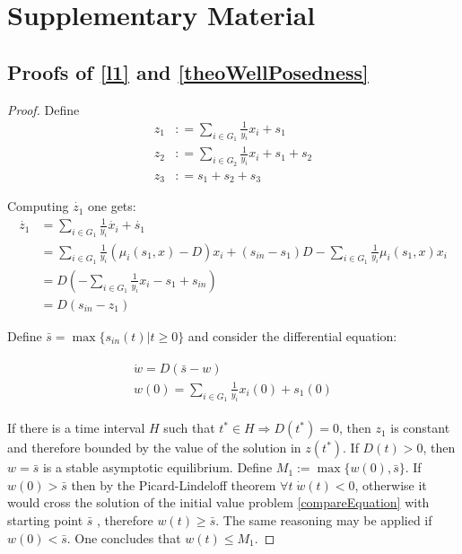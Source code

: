 \documentclass[3p,times]{article}
\begin{document}
\section{Supplementary Material}

\subsection{Proofs of \cref{l1} and \cref{theoWellPosedness}}

\systembounds* 

\begin{proof}
	Define 
	\begin{align}
	z_1 &: = \sum \limits_{i \in G_1} \frac{1}{y_i}x_i + s_1  \\
	z_2 &: = \sum \limits_{i \in G_2} \frac{1}{y_i}x_i + s_1 + s_2 \\
	z_3 &: = s_1 + s_2 + s_3
	\end{align} 
	
	Computing $\dot{z_{1}}$ one gets:
	\begin{align*}
	\dot{z_{1}} &=\sum \limits_{i \in G_1} \frac{1}{y_i}\dot{x_i} + \dot{s_1} \\
	& = \sum \limits_{i \in G_1} \frac{1}{y_i}\left(\mu_i(s_1,x) -D \right)x_i + (s_{in}-s_1)D-\sum\limits_{i \in G_1}\frac{1}{y_i}\mu_i(s_1,x) x_i   \\
	&= 	D\left(-\sum \limits_{i \in G_1} \frac{1}{y_i}x_i - s_1 + s_{in}\right)  \\
	& = D(s_{in} - z_1)
	\end{align*}
	
	Define $\bar{s} =\max\{s_{in}(t) | t\geq 0\}$ and consider the differential equation:
	
	\begin{align}
	\label{compareEquation}
	\begin{array}{l}
	\dot{w} = D(\bar{s} - w) \\
	w(0) = \sum \limits_{i \in G_1} \frac{1}{y_i}x_i(0) + s_1(0)
	\end{array}
	\end{align}
	
	If there is a time interval $H$ such that $t^*\in H  \Rightarrow D(t^*) = 0$, then $z_1$ is constant and therefore bounded by  the value of the solution in $z(t^*)$. 
	If $D(t) > 0$, then $w = \bar{s}$ is a stable asymptotic equilibrium. Define $M_1 :=  \max\{w(0),\bar{s}\}$. If $ w(0) > \bar{s}$ then by the Picard-Lindeloff theorem $ \forall t \; \dot{w}(t) < 0 $, otherwise it would cross the solution of the initial value problem \eqref{compareEquation} with starting point $\bar{s}$ , therefore $w(t) \geq \bar{s}$. The same reasoning may be applied if $ w(0) < \bar{s}$. One concludes that $ w(t) \leq M_1 $. 
	

\end{proof}
\end{document}
